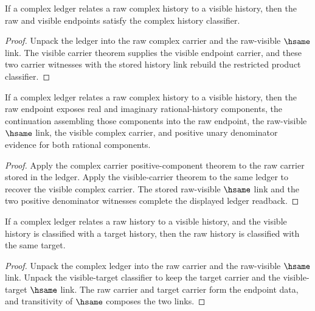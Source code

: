 \begin{theorem}
\label{thm:complex-ledger-raw-visible-classifier}
If a complex ledger relates a raw complex history to a visible history, then
the raw and visible endpoints satisfy the complex history classifier.
\end{theorem}
\begin{proof}
Unpack the ledger into the raw complex carrier and the raw-visible
\(\hsame\) link. The visible carrier theorem supplies the visible endpoint
carrier, and these two carrier witnesses with the stored history link rebuild
the restricted product classifier.
\end{proof}

\begin{theorem}
\label{thm:complex-ledger-positive-components}
If a complex ledger relates a raw complex history to a visible history, then
the raw endpoint exposes real and imaginary rational-history components, the
continuation assembling those components into the raw endpoint, the
raw-visible \(\hsame\) link, the visible complex carrier, and positive unary
denominator evidence for both rational components.
\end{theorem}
\begin{proof}
Apply the complex carrier positive-component theorem to the raw carrier stored
in the ledger. Apply the visible-carrier theorem to the same ledger to recover
the visible complex carrier. The stored raw-visible \(\hsame\) link and the
two positive denominator witnesses complete the displayed ledger readback.
\end{proof}

\begin{theorem}
\label{thm:complex-ledger-classifier-extension}
If a complex ledger relates a raw history to a visible history, and the visible
history is classified with a target history, then the raw history is classified
with the same target.
\end{theorem}
\begin{proof}
Unpack the complex ledger into the raw carrier and the raw-visible
\(\hsame\) link. Unpack the visible-target classifier to keep the target
carrier and the visible-target \(\hsame\) link. The raw carrier and target
carrier form the endpoint data, and transitivity of \(\hsame\) composes the
two links.
\end{proof}

